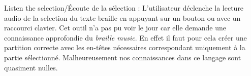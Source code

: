 Listen the selection/Écoute de la sélection : L'utilisateur déclenche
la lecture audio de la selection du texte braille en appuyant sur un
bouton ou avec un raccourci clavier.  Cet outil n'a pas pu voir le
jour car elle demande une connaissance approfondie du \textit{braille music}.
En effet il faut pour cela créer une partition correcte avec les
en-têtes nécessaires correspondant uniquement à la partie sélectionné.
Malheureusement nos connaissances dans ce langage sont quasiment
nulles.



